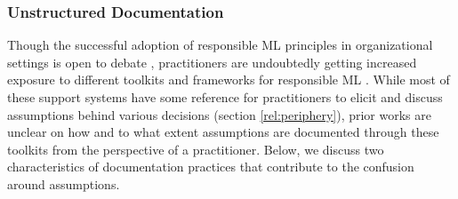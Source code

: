



\subsubsection {Unstructured Documentation}
\label{subsec:doc}

Though the successful adoption of responsible ML principles in organizational settings is open to debate \cite{deshpande2022responsible,rakova2021responsible,raiAdoption}, practitioners are undoubtedly getting increased exposure to different toolkits and frameworks for responsible ML \cite{liang2024systematic,yang2024navigating}. While most of these support systems have some reference for practitioners to elicit and discuss assumptions behind various decisions (section \ref{rel:periphery}), prior works are unclear on how and to what extent assumptions are documented through these toolkits from the perspective of a practitioner. Below, we discuss two characteristics of documentation practices that contribute to the confusion around assumptions.

